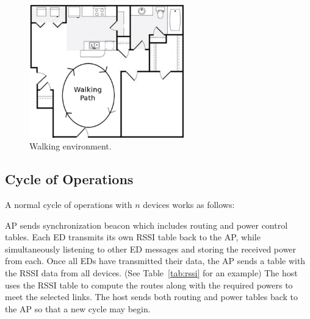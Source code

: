 \documentclass{article}
\begin{document}
\begin{figure}[!htb]
\begin{center}
\includegraphics[width=0.6\textwidth]{figures/floorplan.pdf}
\end{center}
\caption{Walking environment.}
\label{fig:floorplan}
\end{figure}

\subsection{Cycle of Operations}\label{subsec:cycleofoperations}
A normal cycle of operations with $n$ devices works as follows:

\begin{algorithmic}[1]
\STATE AP sends synchronization beacon which includes routing and power control tables.
\STATE Each ED transmits its own RSSI table back to the AP, while simultaneously listening to other ED messages and storing the received power from each.
\STATE Once all EDs have transmitted their data, the AP sends a table with the RSSI data from all devices. (See Table~\ref{tab:rssi} for an example)
\STATE The host uses the RSSI table to compute the routes along with the required powers to meet the selected links.
\STATE The host sends both routing and power tables back to the AP so that a new cycle may begin.
\end{algorithmic}
\end{document}
